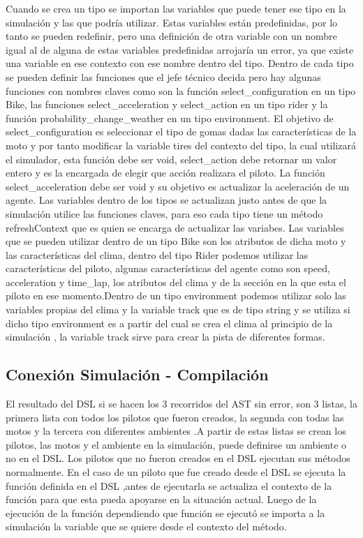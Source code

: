 \documentclass[12pt, letterpaper,spanish]{article}
\theoremstyle{definition}
\theoremstyle{remark}
\begin{document}
        Cuando se crea un tipo se importan las variables que puede tener ese tipo en la simulación y las que podría utilizar. Estas variables están predefinidas, por lo tanto se pueden redefinir, pero una definición de otra variable con un nombre igual al de alguna de estas variables predefinidas arrojaría un error, ya que existe una variable en ese contexto con ese nombre dentro del tipo. Dentro de cada tipo se pueden definir las funciones que el jefe técnico decida pero hay algunas funciones con nombres claves como son la función select\_configuration en un tipo Bike, las funciones select\_acceleration y select\_action en un tipo rider y la función probability\_change\_weather en un tipo environment. El objetivo de select\_configuration es seleccionar el tipo de gomas dadas las características de la moto y por tanto modificar la variable tires del contexto del tipo, la cual utilizará el simulador, esta función debe ser void, select\_action debe retornar un valor entero y es la encargada de elegir que acción realizara el piloto. La función select\_acceleration debe ser void y su objetivo es actualizar la aceleración de un agente. Las variables dentro de los tipos se actualizan justo antes de que la simulación utilice las funciones claves, para eso cada tipo tiene un método refreshContext que es quien se encarga de actualizar las variabes. Las variables que se pueden utilizar dentro de un tipo Bike son los atributos de dicha moto y las características del clima, dentro del tipo Rider podemos utilizar las características del piloto, algunas características del agente como son speed, acceleration
        y time\_lap, los atributos del clima y de la sección en la que esta el piloto en ese momento.Dentro de un tipo environment podemos utilizar solo las variables propias del clima y la variable track que es de tipo string y se utiliza si dicho tipo environment es a partir del cual se crea el clima al principio de la simulación , la variable track sirve para crear la pista de diferentes formas.      


	\subsection{Conexión Simulación - Compilación}
	El resultado del DSL si se hacen los 3 recorridos del AST sin error, son 3 listas, la primera lista con todos los pilotos que fueron creados, la segunda con todas las motos y la tercera con diferentes ambientes .A partir de estas listas se crean los pilotos, las motos y el ambiente en la simulación, puede definirse un ambiente o no en el DSL. 
        Los pilotos que no fueron creados en el DSL ejecutan sus métodos normalmente. En el caso de un piloto que fue creado desde el DSL se ejecuta la función definida en el DSL ,antes de ejecutarla se actualiza el contexto de la función para que esta pueda apoyarse en la situación actual. Luego de la ejecución de la función dependiendo que función se ejecutó se importa a la simulación la variable que se quiere desde el contexto del método.
	
\end{document}
